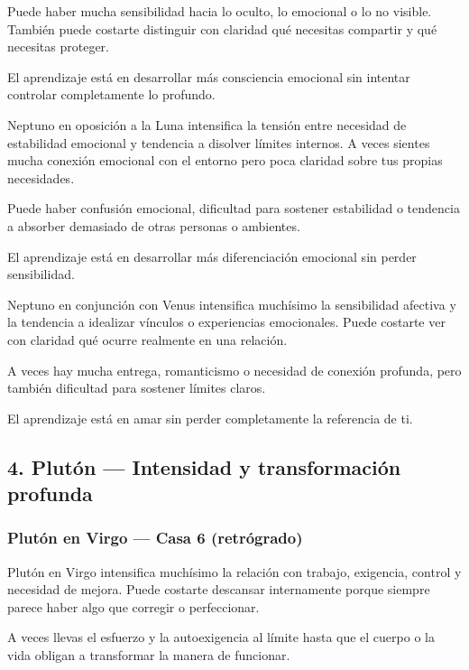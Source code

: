 \documentclass[11pt,a4paper]{article}
\begin{document}
Puede haber mucha sensibilidad hacia lo oculto, lo emocional o lo no visible. También puede costarte distinguir con claridad qué necesitas compartir y qué necesitas proteger.

El aprendizaje está en desarrollar más consciencia emocional sin intentar controlar completamente lo profundo.

Neptuno en oposición a la Luna intensifica la tensión entre necesidad de estabilidad emocional y tendencia a disolver límites internos. A veces sientes mucha conexión emocional con el entorno pero poca claridad sobre tus propias necesidades.

Puede haber confusión emocional, dificultad para sostener estabilidad o tendencia a absorber demasiado de otras personas o ambientes.

El aprendizaje está en desarrollar más diferenciación emocional sin perder sensibilidad.

Neptuno en conjunción con Venus intensifica muchísimo la sensibilidad afectiva y la tendencia a idealizar vínculos o experiencias emocionales. Puede costarte ver con claridad qué ocurre realmente en una relación.

A veces hay mucha entrega, romanticismo o necesidad de conexión profunda, pero también dificultad para sostener límites claros.

El aprendizaje está en amar sin perder completamente la referencia de ti.

\vspace{0.8cm}

\subsection{4. Plutón — Intensidad y transformación profunda}

\subsubsection*{Plutón en Virgo — Casa 6 (retrógrado)}

Plutón en Virgo intensifica muchísimo la relación con trabajo, exigencia, control y necesidad de mejora. Puede costarte descansar internamente porque siempre parece haber algo que corregir o perfeccionar.

A veces llevas el esfuerzo y la autoexigencia al límite hasta que el cuerpo o la vida obligan a transformar la manera de funcionar.
\end{document}
